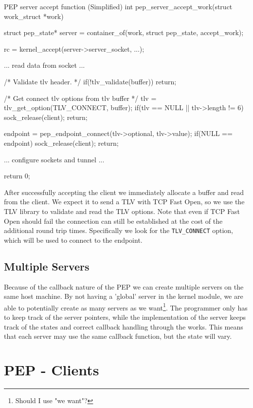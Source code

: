 \documentclass[a4paper,english, 11pt]{report}
\begin{document}
\begin{autonumlstlisting}[label=lst:pep_server_accept]{PEP server accept function (Simplified)}
int pep_server_accept_work(struct work_struct *work)
{
    struct pep_state* server = container_of(work, struct pep_state, accept_work);

    rc = kernel_accept(server->server_socket, ...);
    
    ... read data from socket ...

    /* Validate tlv header. */
    if(!tlv_validate(buffer)){
        return;
    }
    
    /* Get connect tlv options from tlv buffer */
    tlv = tlv_get_option(TLV_CONNECT, buffer);
    if(tlv == NULL || tlv->length != 6){
        sock_release(client);
        return; 
    }

    endpoint = pep_endpoint_connect(tlv->optional, tlv->value);
    if(NULL == endpoint){
        sock_release(client);
        return; 
    }
    
    ... configure sockets and tunnel ...
    
    return 0;
}
\end{autonumlstlisting}


After successfully accepting the client we immediately allocate a buffer and read from the client. We expect it to send a TLV with TCP Fast Open, so we use the TLV library to validate and read the TLV options. Note that even if TCP Fast Open should fail the connection can still be established at the cost of the additional round trip times. Specifically we look for the \verb|TLV_CONNECT| option, which will be used to connect to the endpoint.\\

\subsection{Multiple Servers}
Because of the callback nature of the PEP we can create multiple servers on the same host machine. By not having a 'global' server in the kernel module, we are able to potentially create as many servers as we want\footnote{Should I use "we want"?}. The programmer only has to keep track of the server pointers, while the implementation of the server keeps track of the states and correct callback handling through the works. This means that each server may use the same callback function, but the state will vary.

\section{PEP - Clients}
\end{document}
